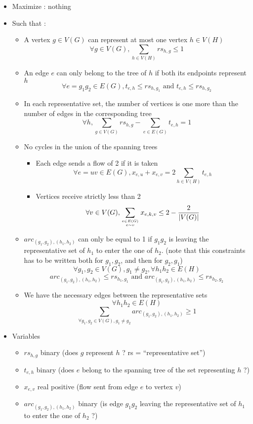 \begin{itemize}
\item Maximize : nothing
\item Such that :
  \begin{itemize}
  \item A vertex $g\in V(G)$ can represent at most one vertex $h\in V(H)$
    $$\forall g\in V(G), \sum_{h\in V(H)}rs_{h,g}\leq 1$$
  \item An edge $e$ can only belong to the tree of $h$ if both its endpoints represent $h$
    $$\forall e=g_1g_2\in E(G), t_{e,h}\leq rs_{h,g_1}\text{ and }t_{e,h}\leq rs_{h,g_2}$$
  \item In each representative set, the number of vertices is one more than the number of edges in the corresponding tree
    $$\forall h, \sum_{g\in V(G)}rs_{h,g}-\sum_{e\in E(G)}t_{e,h} = 1$$
  \item No cycles in the union of the spanning trees
    \begin{itemize}
    \item Each edge sends a flow of 2 if it is taken
      $$\forall e=uv\in E(G), x_{e,u} + x_{e,v} = 2\sum_{h\in V(H)}t_{e,h}$$
    \item Vertices receive strictly less than 2
      $$ \forall v\in V(G), \sum_{e\in E(G)\atop e\sim v}x_{e,k,v}\leq 2-\frac 2 {|V(G)|}$$
    \end{itemize}
  \item $arc_{(g_1,g_2),(h_1,h_2)}$ can only be equal to 1 if $g_1g_2$ is leaving the representative set of $h_1$ to enter the one of $h_2$. (note that this constraints has to be written both for $g_1, g_2$, and then for $g_2, g_1$)
    $$\forall g_1, g_2\in V(G), g_1\neq g_2, \forall h_1h_2\in E(H)$$$$arc_{(g_1,g_2),(h_1,h_2)}\leq rs_{h_1, g_1} \text{ and }arc_{(g_1,g_2),(h_1,h_2)}\leq rs_{h_2, g_2}$$
  \item We have the necessary edges between the representative sets
    $$\forall h_1h_2\in E(H)$$$$\sum_{\forall g_1, g_2\in V(G), g_1\neq g_2}arc_{(g_1,g_2),(h_1,h_2)}\geq 1$$
  \end{itemize}
\item Variables
  \begin{itemize}
  \item $rs_{h,g}$ binary (does $g$ represent $h$ ? rs = ``representative set'')
  \item $t_{e,h}$ binary (does $e$ belong to the spanning tree of the set representing $h$ ?)
  \item $x_{e,v}$ real positive (flow sent from edge $e$ to vertex $v$)
  \item $arc_{(g_1,g_2),(h_1,h_2)}$ binary (is edge $g_1g_2$ leaving the representative set of $h_1$ to enter the one of $h_2$ ?)
  \end{itemize}
\end{itemize}

